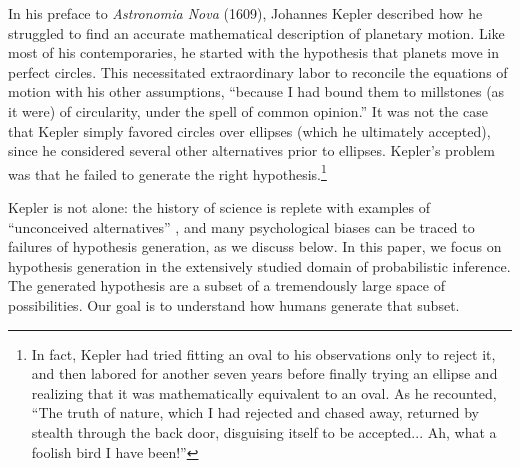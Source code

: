In his preface to \emph{Astronomia Nova} (1609), Johannes Kepler described how he struggled to find an accurate mathematical description of planetary motion. Like most of his contemporaries, he started with the hypothesis that planets move in perfect circles. This necessitated extraordinary labor to reconcile the equations of motion with his other assumptions, ``because I had bound them to millstones (as it were) of circularity, under the spell of common opinion.'' It was not the case that Kepler simply favored circles over ellipses (which he ultimately accepted), since he considered several other alternatives prior to ellipses. Kepler's problem was that he failed to generate the right hypothesis.\footnote{In fact, Kepler had tried fitting an oval to his observations only to reject it, and then labored for another seven years before finally trying an ellipse and realizing that it was mathematically equivalent to an oval. As he recounted, ``The truth of nature, which I had rejected and chased away, returned by stealth through the back door, disguising itself to be accepted... Ah, what a foolish bird I have been!''} 

Kepler is not alone: the history of science is replete with examples of ``unconceived alternatives'' \citep{stanford10}, and many psychological biases can be traced to failures of hypothesis generation, as we discuss below. In this paper, we focus on hypothesis generation in the extensively studied domain of probabilistic inference. The generated hypothesis are a subset of a tremendously large space of possibilities. Our goal is to understand how humans generate that subset.

